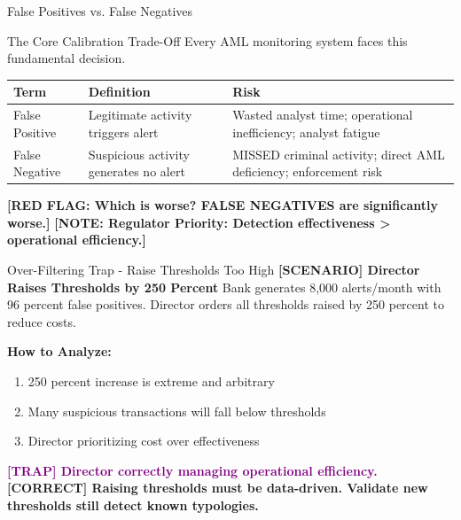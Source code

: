 \documentclass[11pt,a4paper]{beamer}
\newcommand{\trap}[1]{\textcolor{purple}{\textbf{[TRAP] #1}}}
\newcommand{\correct}[1]{\textcolor{green!50!black}{\textbf{[CORRECT] #1}}}
\newcommand{\scenario}[1]{\textcolor{blue!70!black}{\textbf{[SCENARIO] #1}}}
\newcommand{\redflag}[1]{\textcolor{red!80!black}{\textbf{[RED FLAG: #1]}}}
\newcommand{\bluenote}[1]{\textcolor{blue!80!black}{\textbf{[NOTE: #1]}}}
\begin{document}
	\begin{frame}{False Positives vs. False Negatives}
		\begin{block}{The Core Calibration Trade-Off}
			Every AML monitoring system faces this fundamental decision.
		\end{block}
		\begin{tabular}{p{}|p{}|p{}}
			\hline
			\rowcolor{lightgray}
			\textbf{Term} & \textbf{Definition} & \textbf{Risk} \\
			\hline
			False Positive & Legitimate activity triggers alert & Wasted analyst time; operational inefficiency; analyst fatigue \\
			\hline
			False Negative & Suspicious activity generates no alert & MISSED criminal activity; direct AML deficiency; enforcement risk \\
			\hline
		\end{tabular}
		\vspace{0.2cm}
		\redflag{Which is worse? FALSE NEGATIVES are significantly worse.}
		\bluenote{Regulator Priority: Detection effectiveness > operational efficiency.}
	\end{frame}
	
	\begin{frame}{Over-Filtering Trap - Raise Thresholds Too High}
		\scenario{Director Raises Thresholds by 250 Percent}
		Bank generates 8,000 alerts/month with 96 percent false positives. Director orders all thresholds raised by 250 percent to reduce costs.
		
		\vspace{0.1cm}
		\textbf{How to Analyze:}
		\begin{enumerate}
			\item 250 percent increase is extreme and arbitrary
			\item Many suspicious transactions will fall below thresholds
			\item Director prioritizing cost over effectiveness
		\end{enumerate}
		\trap{Director correctly managing operational efficiency.}
		\correct{Raising thresholds must be data-driven. Validate new thresholds still detect known typologies.}
	\end{frame}
	
\end{document}
